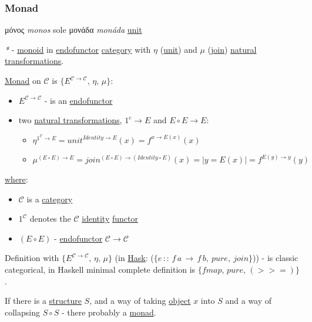 \documentclass[a4paper,14pt,oneside]{book}
\begin{document}
\subsubsection{\label{org84837a3}Monad}
\label{sec:org004631e}
\textgreek{μόνος} \emph{monos} sole
\textgreek{μονάδα} \emph{monáda} \hyperref[org26b7b3d]{unit}

\emph{*} - \hyperref[orge939cab]{monoid} in \hyperref[org40e72f2]{endofunctor} \hyperref[org770b3fc]{category} with \(\eta\) (\hyperref[org26b7b3d]{unit}) and \(\mu\) (\hyperref[org532ec30]{join}) \hyperref[orga627b41]{natural transformations}.

\hyperref[org84837a3]{Monad} on \(\mathcal{C}\) is \(\{E^{\mathcal{C \to C}}, \, \eta, \, \mu\}\):
\begin{itemize}
\item \(E^{\mathcal{C \to C}}\) - is an \hyperref[org40e72f2]{endofunctor}
\item two \hyperref[orga627b41]{natural transformations}, \(1^c \to E\) and \(E \circ E \to E\):
\begin{itemize}
\item \(\eta^{1^{\mathcal{C}} \to E} = {unit}^{Identity \to E}(x) = f^{ x \to E(x)}(x)\)
\item \(\mu^{(E \circ E) \to E} = {join}^{(E \circ E) \to (Identity \circ E)}(x) = | y = E(x) | = f^{E (y) \to y}(y)\)
\end{itemize}
\end{itemize}

\hyperref[org92c9d4e]{where}:
\begin{itemize}
\item \(\mathcal{C}\) is a \hyperref[org770b3fc]{category}
\item \(1^{\mathcal{C}}\) denotes the \(\mathcal{C}\) \hyperref[org295ca20]{identity} \hyperref[orgf8b16d9]{functor}
\item \((E \circ E)\) - \hyperref[org40e72f2]{endofunctor} \(\mathcal{C \to C}\)
\end{itemize}

Definition with \(\{E^{\mathcal{C \to C}}, \, \eta, \, \mu\}\) (in \hyperref[org1f3bb06]{Hask}: (\(\{e \, :: \, f \, a \, \to \, f \, b, \ pure, \ join\}\))) - is classic categorical, in Haskell minimal complete definition is \(\{fmap, \, pure, \, (>>=)\}\).

If there is a \hyperref[org6f004b9]{structure} \(S\), and a way of taking \hyperref[orga8f9422]{object} \(x\) into \(S\) and a way of collapsing \(S \circ S\) - there probably a \hyperref[org84837a3]{monad}.
\end{document}
